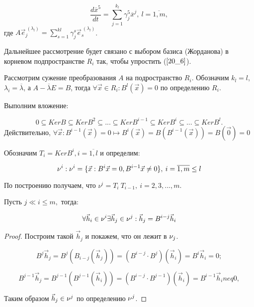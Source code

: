 \documentclass[a4paper, 12pt]{article}
\begin{document}
\begin{equation}\label{20_6}
\frac{d\overline{x}^5}{dt} = \sum\limits_{j = 1}^{k_l}\gamma_j^5 \overline{x}^j, \: l = \overline{1, m},
\end{equation}
где $A \vec{e}^{\: (\lambda_l)}_j = \sum\limits_{s=1}^{kl}\gamma_j^s \vec{e}^{\: (\lambda_l)}_s$.

Дальнейшее рассмотрение будет связано с выбором базиса (Жорданова) в корневом подпространстве $R_i$ так, чтобы  упростить ($\ref{20_6}$).

Рассмотрим сужение преобразования $A$ на подространство $R_i$. Обозначим $k_l = l$, $\lambda_i = \overline{\lambda}$, а $A - \overline{\lambda} E = B$, тогда $\forall \vec{x}\in R_i: B^l (\vec{x}) = 0$ по определению $R_i$.

Выполним вложение:

\[0\subseteq Ker B \subseteq Ker B^2 \subseteq ... \subseteq Ker B^{i - 1} \subseteq Ker B^i \subseteq ... \subseteq Ker B^l.\]
Действительно, $\forall \vec{x}: B^{i-1}(\vec{x}) = 0 \mapsto B^i(\vec{x}) = B(B^{i-1}(\vec{x})) = B(\vec{0}) = 0$

Обозначим $T_i = Ker B^i, i = \overline{1,l}$ и определим:

\[\nu^i: \nu^i= \{\vec{x}: B^i \vec{x} = 0, B^{i-1}\vec{x} \neq 0 \}, \: i = \overline{1,m} \leq l\]

По построению получаем, что $\nu^i = T_i \ T_{i-1}, \: i = 2,3,...,m.$

\begin{theorem}\label{theor-20_1}
Пусть $j \ll i \leq m,$ тогда:

\begin{equation}\label{20_7}
\forall \vec{h}_i \in \nu^i \exists \vec{h}_j \in  \nu^j: \vec{h}_j = B^{i - j} \vec{h}_i
\end{equation}
\begin{proof}

Построим такой $\vec{h}_j$ и покажем, что он лежит в $\nu_j$.

\[B^j\vec{h}_j = B^j (B_{i-j} (\vec{h}_j)) = (B^{i - j} \cdot B^j)(\vec{h}_i) = B^i \vec{h}_i = 0; \]

\[B^{j- 1} \vec{h}_j = B^{j - 1}(B^{j - 1} (\vec{h}_i)) = (B^{i - j} \cdot B^{j-1})(\vec{h}_i) = B^{i-1} \vec{h}_i neq 0,\]

Таким образом $\vec{h}_j \in \nu^j$ по определению $\nu^j$.
\end{proof}
\end{theorem}
\end{document}
